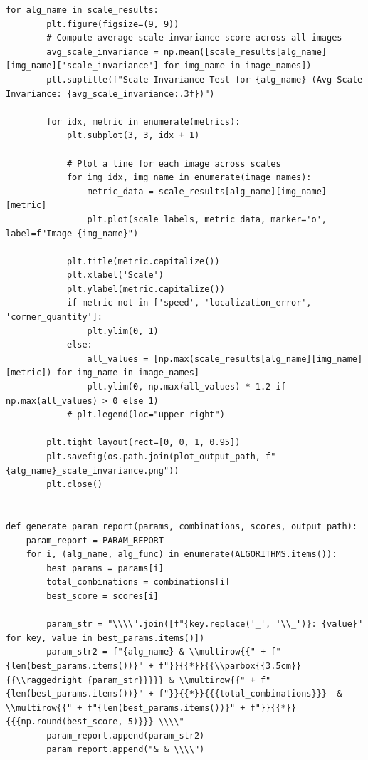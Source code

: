 \documentclass[journal]{IEEEtran}
\begin{document}
\begin{lstlisting}[style=python, caption={Utility Functions for Data Processing}, label={lst:utilities}]
    for alg_name in scale_results:
        plt.figure(figsize=(9, 9))
        # Compute average scale invariance score across all images
        avg_scale_invariance = np.mean([scale_results[alg_name][img_name]['scale_invariance'] for img_name in image_names])
        plt.suptitle(f"Scale Invariance Test for {alg_name} (Avg Scale Invariance: {avg_scale_invariance:.3f})")
        
        for idx, metric in enumerate(metrics):
            plt.subplot(3, 3, idx + 1)
            
            # Plot a line for each image across scales
            for img_idx, img_name in enumerate(image_names):
                metric_data = scale_results[alg_name][img_name][metric]
                plt.plot(scale_labels, metric_data, marker='o', label=f"Image {img_name}")
            
            plt.title(metric.capitalize())
            plt.xlabel('Scale')
            plt.ylabel(metric.capitalize())
            if metric not in ['speed', 'localization_error', 'corner_quantity']:
                plt.ylim(0, 1)
            else:
                all_values = [np.max(scale_results[alg_name][img_name][metric]) for img_name in image_names]
                plt.ylim(0, np.max(all_values) * 1.2 if np.max(all_values) > 0 else 1)
            # plt.legend(loc="upper right")
        
        plt.tight_layout(rect=[0, 0, 1, 0.95])
        plt.savefig(os.path.join(plot_output_path, f"{alg_name}_scale_invariance.png"))
        plt.close() 
        

def generate_param_report(params, combinations, scores, output_path):
    param_report = PARAM_REPORT
    for i, (alg_name, alg_func) in enumerate(ALGORITHMS.items()):
        best_params = params[i]
        total_combinations = combinations[i]
        best_score = scores[i]
        
        param_str = "\\\\".join([f"{key.replace('_', '\\_')}: {value}" for key, value in best_params.items()])
        param_str2 = f"{alg_name} & \\multirow{{" + f"{len(best_params.items())}" + f"}}{{*}}{{\\parbox{{3.5cm}}{{\\raggedright {param_str}}}}} & \\multirow{{" + f"{len(best_params.items())}" + f"}}{{*}}{{{total_combinations}}}  & \\multirow{{" + f"{len(best_params.items())}" + f"}}{{*}}{{{np.round(best_score, 5)}}} \\\\"
        param_report.append(param_str2)
        param_report.append("& & \\\\")
        

\end{lstlisting}
\end{document}
